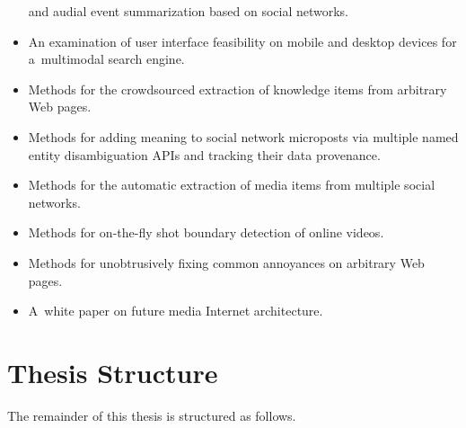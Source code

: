 \begin{itemize}
        and audial event summarization based on social networks.
  \item An examination of user interface feasibility on
        mobile and desktop devices for a~multimodal search engine.
  \item Methods for the crowdsourced extraction of knowledge items
        from arbitrary Web pages.
  \item Methods for adding meaning to social network microposts
        via multiple named entity disambiguation APIs and
        tracking their data provenance.
  \item Methods for the automatic extraction of media items from
        multiple social networks.
  \item Methods for on-the-fly shot boundary detection of
        online videos.
   \item Methods for unobtrusively fixing common annoyances on
         arbitrary Web pages.
   \item A~white paper on future media Internet architecture.
\end{itemize}

\section{Thesis Structure}

The remainder of this thesis is structured as follows. 
